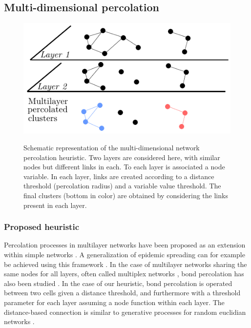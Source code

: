 \documentclass{jimis-en}
\begin{document}
\subsection{Multi-dimensional percolation}



\begin{figure}[ht] 
  {\includegraphics[width=\linewidth]{figures/principle.pdf}}
  \centering
  \caption{Schematic representation of the multi-dimensional network percolation heuristic. Two layers are considered here, with similar nodes but different links in each. To each layer is associated a node variable. In each layer, links are created according to a distance threshold (percolation radius) and a variable value threshold. The final clusters (bottom in color) are obtained by considering the links present in each layer.\label{fig:method}}
\end{figure}


\subsubsection{Proposed heuristic}

Percolation processes in multilayer networks have been proposed as an extension within simple networks \citep{boccaletti2014structure}. A generalization of epidemic spreading can for example be achieved using this framework \citep{son2012percolation}. In the case of multilayer networks sharing the same nodes for all layers, often called multiplex networks \citep{aleta2018multilayer}, bond percolation has also been studied \citep{hackett2016bond}. In the case of our heuristic, bond percolation is operated between two cells given a distance threshold, and furthermore with a threshold parameter for each layer assuming a node function within each layer. The distance-based connection is similar to generative processes for random euclidian networks \citep{penrose1999k}.
\end{document}
